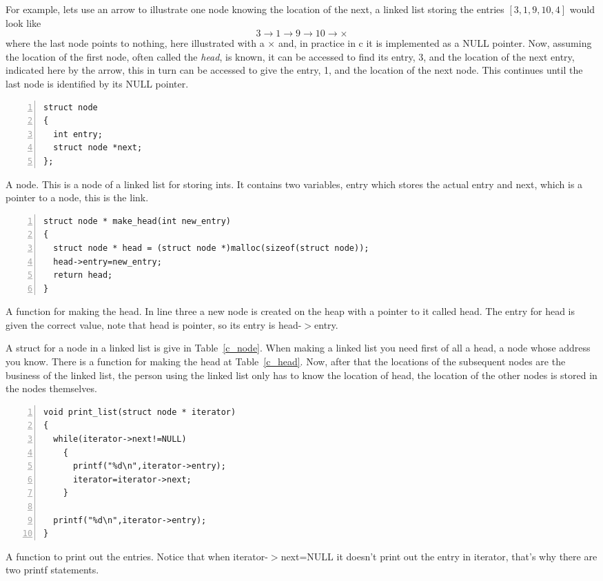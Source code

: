 \documentclass[11pt,a4paper]{scrartcl}
\begin{document}
For example, lets use an arrow to illustrate one node knowing the
location of the next, a linked list storing the entries $[3,1,9,10,4]$
would look like
\begin{equation}
3\rightarrow 1\rightarrow 9\rightarrow 10\rightarrow \times
\end{equation}
where the last node points to nothing, here illustrated with a
$\times$ and, in practice in c it is implemented as a NULL pointer. Now,
assuming the location of the first node, often called the {\sl head},
is known, it can be accessed to find its entry, 3, and the location of
the next entry, indicated here by the arrow, this in turn can be
accessed to give the entry, 1, and the location of the next node. This
continues until the last node is identified by its NULL pointer. 

\begin{table}
\begin{lstlisting}[numbers=left]
struct node
{
  int entry;
  struct node *next;
};
\end{lstlisting}
\caption{A node. This is a node of a linked list for storing ints. It
  contains two variables, entry which stores the actual entry and
  next, which is a pointer to a node, this is the link. \label{c_node}}
\end{table}

\begin{table}
\begin{lstlisting}[numbers=left]
struct node * make_head(int new_entry)
{
  struct node * head = (struct node *)malloc(sizeof(struct node));
  head->entry=new_entry;
  return head;
}
\end{lstlisting}
\caption{A function for making the head. In line three a new node is
  created on the heap with a pointer to it called head. The entry for
  head is given the correct value, note that head is pointer, so its
  entry is head-$>$entry. \label{c_head}}
\end{table}


A struct for a node in a linked list is give in
Table~\ref{c_node}. When making a linked list you need first of all a
head, a node whose address you know. There is a function for making
the head at Table~\ref{c_head}. Now, after that the locations of the
subsequent nodes are the business of the linked list, the person using
the linked list only has to know the location of head, the location of
the other nodes is stored in the nodes themselves. 


\begin{table}
\begin{lstlisting}[numbers=left]
void print_list(struct node * iterator)
{
  while(iterator->next!=NULL)
    {
      printf("%d\n",iterator->entry);
      iterator=iterator->next;
    }

  printf("%d\n",iterator->entry);
}
\end{lstlisting}
\caption{A function to print out the entries. Notice that when
  iterator-$>$next=NULL it doesn't print out the entry in iterator,
  that's why there are two printf statements.\label{c_print}}
\end{table}
\end{document}
